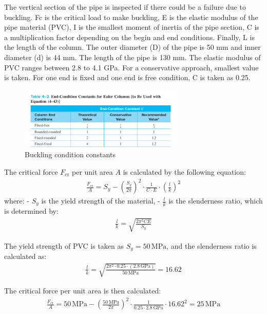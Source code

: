 \documentclass[12pt]{article}
\begin{document}
The vertical section of the pipe is inspected if there could be a failure due to buckling.
Fc is the critical load to make buckling, E is the elastic modulus of the pipe material (PVC), I is the smallest moment of inertia of the pipe section, C is a multiplication factor depending on the begin and end conditions. Finally, L is the length of the column. 
The outer diameter (D) of the pipe is 50 mm and inner diameter (d) is 44 mm. The length of the pipe is 130 mm. The elastic modulus of PVC ranges between 2.8 to 4.1 GPa. For a conservative approach, smallest value is taken. For one end is fixed and one end is free condition, C is taken as 0.25.
\begin{figure}[h]
    \centering
    \includegraphics[width=0.7\textwidth]{Figures/buckling conditions.png}
    \caption{Buckling condition constants}
    \label{fig:buckling}
\end{figure}

The critical force \( F_{\text{cr}} \) per unit area \( A \) is calculated by the following equation:
\begin{align}
\frac{F_{\text{cr}}}{A} = S_y - \left( \frac{S_y}{2\pi} \right)^2 \cdot \frac{1}{C \cdot E} \cdot \left( \frac{l}{k} \right)^2
\end{align}
where:
- \( S_y \) is the yield strength of the material,
- \( \frac{l}{k} \) is the slenderness ratio, which is determined by:
\begin{align}
\frac{l}{k} = \sqrt{\frac{2 \pi^2 C E}{S_y}}
\end{align}

The yield strength of PVC is taken as \( S_y = 50 \, \text{MPa} \), and the slenderness ratio is calculated as:
\begin{align}
\frac{l}{k} = \sqrt{\frac{2 \pi^2 \cdot 0.25 \cdot (2.8 \, \text{GPa})}{50 \, \text{MPa}}} = 16.62
\end{align}

The critical force per unit area is then calculated:
\begin{align}
\frac{F_{\text{cr}}}{A} = 50 \, \text{MPa} - \left( \frac{50 \, \text{MPa}}{2\pi} \right)^2 \cdot \frac{1}{0.25 \cdot 2.8 \, \text{GPa}} \cdot 16.62^2 = 25 \, \text{MPa}
\end{align}
\end{document}
